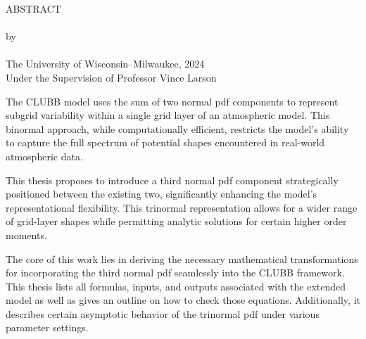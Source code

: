 \begin{center}
    ABSTRACT
    \\
    \singlespacing
    \mytitle\\
    \doublespacing
    by\\
    \myauthor\\
    \singlespacing
    The University of Wisconsin--Milwaukee, 2024\\
    Under the Supervision of Professor Vince Larson
\end{center}

The \gls{CLUBB} model uses the sum of two normal \gls{pdf} components to represent subgrid variability
within a single grid layer of an atmospheric model.
This binormal approach, while computationally efficient,
restricts the model's ability to capture the full spectrum of potential shapes encountered in real-world atmospheric data.

This thesis proposes to introduce a third normal \gls{pdf} component strategically positioned between the existing two,
significantly enhancing the model's representational flexibility.
This trinormal representation allows for a wider range of grid-layer shapes
while permitting analytic solutions for certain higher order moments.

The core of this work lies in deriving the necessary mathematical transformations
for incorporating the third normal \gls{pdf} seamlessly into the \gls{CLUBB} framework.
This thesis lists all formulas, inputs, and outputs associated with the extended model
as well as gives an outline on how to check those equations.
Additionally,
it describes certain asymptotic behavior of the trinormal \gls{pdf}
under various parameter settings.
